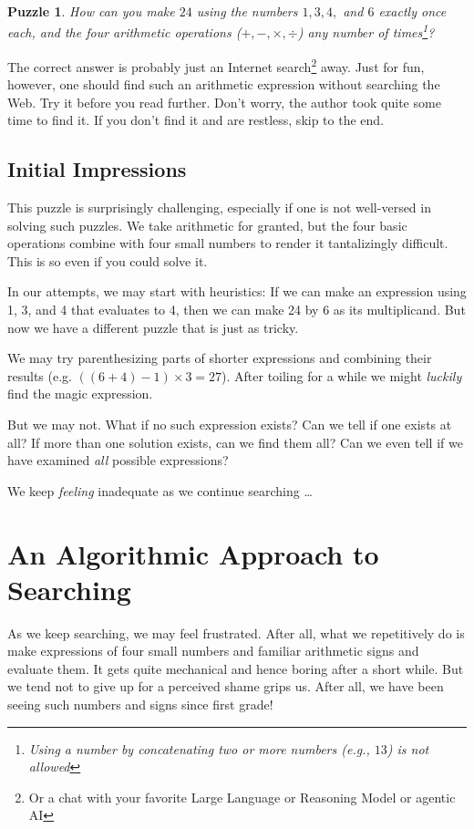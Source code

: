 \documentclass{resonance}
\newtheorem{question}{Puzzle}
\begin{document}
\begin{question}
\label{puzzle1}
How can you make $24$ using the numbers $1, 3, 4,$ and $6$ exactly once each, and the four arithmetic operations ($+, -, \times, \div$) any number of times\footnote{Using a number by concatenating two or more numbers (e.g., $13$) is not allowed}?
\end{question}

The correct answer is probably just an Internet search\footnote{Or a chat with your favorite Large Language or Reasoning Model or agentic AI} away. Just for fun, however, one should find such an arithmetic expression without searching the Web. Try it before you read further. Don't worry, the author took quite some time to find it. If you don't find it and are restless, skip to the end.

\subsection{Initial Impressions}
This puzzle is surprisingly challenging, especially if one is not well-versed in solving such puzzles. We take arithmetic for granted, but the four basic operations combine with four small numbers to render it tantalizingly difficult. This is so even if you could solve it.

In our attempts, we may start with heuristics: If we can make an expression using 1, 3, and 4 that evaluates to 4, then we can make 24 by 6 as its multiplicand. But now we have a different puzzle that is just as tricky.

We may try parenthesizing parts of shorter expressions and combining their results (e.g. $((6+4)-1)\times3 = 27$). After toiling for a while we might \emph{luckily} find the magic expression.

But we may not. What if no such expression exists? Can we tell if one exists at all? If more than one solution exists, can we find them all? Can we even tell if we have examined \emph{all} possible expressions?

We keep \emph{feeling} inadequate as we continue searching \dots
\section{An Algorithmic Approach to Searching}
As we keep searching, we may feel frustrated. After all, what we repetitively do is make expressions of four small numbers and familiar arithmetic signs and evaluate them. It gets quite mechanical and hence boring after a short while. But we tend not to give up for a perceived shame grips us. After all, we have been seeing such numbers and signs since first grade!
\end{document}
